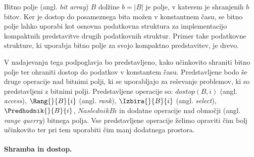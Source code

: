 Bitno polje (angl. \textit{bit array}) $B$ dolžine $b=|B|$ je polje, v katerem je shranjenih $b$ bitov. Ker je dostop do posameznega bita možen v konstantnem času, se bitno polje lahko uporabi kot osnovna podatkovna struktura za implementacijo kompaktnih predstavitve drugih podatkovnih struktur. Primer take podatkovne strukture, ki uporabja bitno polje za svojo kompaktno predstavitev, je drevo.

V nadajevanju tega podpoglavja bo predstavljeno, kako učinkovito shraniti bitno polje ter ohraniti dostop do podatkov v konstantem času. Predstavljene bodo še druge operacije nad bitnimi polji, ki se uporabljajo za reševanje problemov, ki so predstavljeni z bitnimi polji. Predstavljene operacije so: $dostop(B,i)$ (angl. \textit{access}), $\Rang{}{B}{i}$ (angl. \textit{rank}), $\Izbira{}{B}{i}$ (angl. \textit{select}), $\Predhodnik{}{B}{i}$, $Naslednik{}{B}{i}$ in dodatne operacije nad območji (angl. \textit{range querry}) bitnega polja. Vse predstavljene operacije želimo opraviti čim bolj učinkovito ter pri tem uporabiti čim manj dodatnega prostora.

%

\paragraph{Shramba in dostop.}

